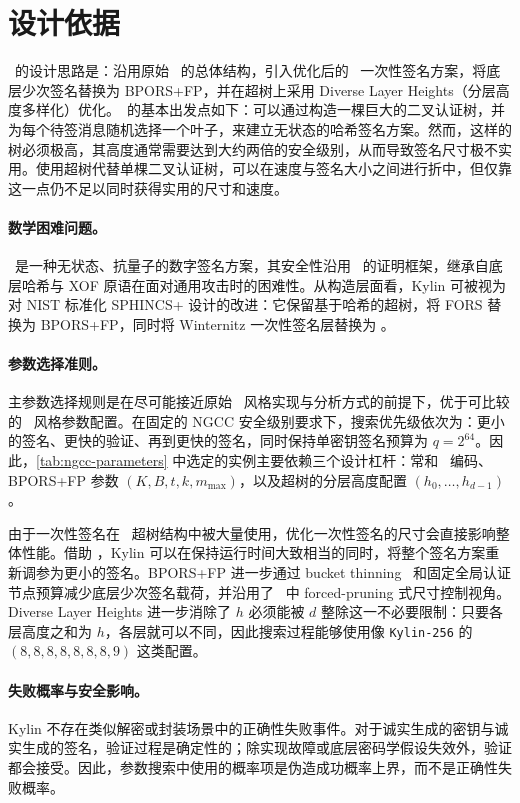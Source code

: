 \section{设计依据}
\label{sec:design-rationale}

\SPHINCSA\ 的设计思路是：沿用原始 \SPHINCSP\ 的总体结构，引入优化后的 \WOTSCS\ 一次性签名方案，将底层少次签名替换为 BPORS+FP，并在超树上采用 Diverse Layer Heights（分层高度多样化）优化。\SPHINCSP\ 的基本出发点如下：可以通过构造一棵巨大的二叉认证树，并为每个待签消息随机选择一个叶子，来建立无状态的哈希签名方案。然而，这样的树必须极高，其高度通常需要达到大约两倍的安全级别，从而导致签名尺寸极不实用。使用超树代替单棵二叉认证树，可以在速度与签名大小之间进行折中，但仅靠这一点仍不足以同时获得实用的尺寸和速度。

\paragraph{数学困难问题。}
\SPHINCSA\ 是一种无状态、抗量子的数字签名方案，其安全性沿用 \SPHINCSP\ 的证明框架，继承自底层哈希与 XOF 原语在面对通用攻击时的困难性。从构造层面看，Kylin 可被视为对 NIST 标准化 SPHINCS+ 设计的改进：它保留基于哈希的超树，将 FORS 替换为 BPORS+FP，同时将 Winternitz 一次性签名层替换为 \WOTSCS。

\paragraph{参数选择准则。}
主参数选择规则是在尽可能接近原始 \SPHINCSP\ 风格实现与分析方式的前提下，优于可比较的 \SPHINCSP\ 风格参数配置。在固定的 NGCC 安全级别要求下，搜索优先级依次为：更小的签名、更快的验证、再到更快的签名，同时保持单密钥签名预算为 $q=2^{64}$。因此，\cref{tab:ngcc-parameters} 中选定的实例主要依赖三个设计杠杆：常和 \WOTSCS\ 编码、BPORS+FP 参数 $(K,B,t,k,m_{\max})$，以及超树的分层高度配置 $(h_0,\ldots,h_{d-1})$。

由于一次性签名在 \SPHINCSP\ 超树结构中被大量使用，优化一次性签名的尺寸会直接影响整体性能。借助 \WOTSCS，Kylin 可以在保持运行时间大致相当的同时，将整个签名方案重新调参为更小的签名。BPORS+FP 进一步通过 bucket thinning~\cite{bucketthinning} 和固定全局认证节点预算减少底层少次签名载荷，并沿用了~\cite{EPRINT:AbrKat25} 中 forced-pruning 式尺寸控制视角。Diverse Layer Heights 进一步消除了 $h$ 必须能被 $d$ 整除这一不必要限制：只要各层高度之和为 $h$，各层就可以不同，因此搜索过程能够使用像 \texttt{Kylin-256} 的 $(8,8,8,8,8,8,8,9)$ 这类配置。

\paragraph{失败概率与安全影响。}
Kylin 不存在类似解密或封装场景中的正确性失败事件。对于诚实生成的密钥与诚实生成的签名，验证过程是确定性的；除实现故障或底层密码学假设失效外，验证都会接受。因此，参数搜索中使用的概率项是伪造成功概率上界，而不是正确性失败概率。

